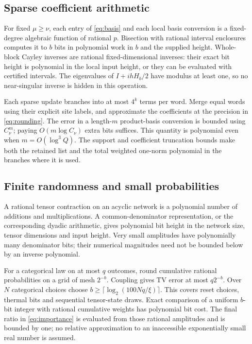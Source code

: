 \documentclass[11pt,reqno]{amsart}
\numberwithin{equation}{section}
\theoremstyle{definition}
\theoremstyle{remark}
\begin{document}
\subsection{Sparse coefficient arithmetic}
For fixed $\mu\geq\nu$, each entry of \eqref{eq:basis} and each local basis conversion is a fixed-degree algebraic function of rational $p$. Bisection with rational interval enclosures computes it to $b$ bits in polynomial work in $b$ and the supplied height. Whole-block Cayley inverses are rational fixed-dimensional inverses: their exact bit height is polynomial in the local input height, or they can be evaluated with certified intervals. The eigenvalues of $I+ihH_b/2$ have modulus at least one, so no near-singular inverse is hidden in this operation.

Each sparse update branches into at most $4^k$ terms per word. Merge equal words using their explicit site labels, and approximate the coefficients at the precision in \eqref{eq:rounding}. The error in a length-$m$ product-basis conversion is bounded using $C_\nu^m$; paying $O(m\log C_\nu)$ extra bits suffices. This quantity is polynomial even when $m=O(\log^3 Q)$. The support and coefficient truncation bounds make both the retained list and the total weighted one-norm polynomial in the branches where it is used.

\subsection{Finite randomness and small probabilities}
A rational tensor contraction on an acyclic network is a polynomial number of additions and multiplications. A common-denominator representation, or the corresponding dyadic arithmetic, gives polynomial bit height in the network size, tensor dimensions and input height. Very small amplitudes have polynomially many denominator bits; their numerical magnitudes need not be bounded below by an inverse polynomial.

For a categorical law on at most $q$ outcomes, round cumulative rational probabilities on a grid of mesh $2^{-b}$. Coupling gives TV error at most $q2^{-b}$. Over $N$ categorical choices choose $b\geq\lceil\log_2(100Nq/\xi)\rceil$. This covers reset choices, thermal bits and sequential tensor-state draws. Exact comparison of a uniform $b$-bit integer with rational cumulative weights has polynomial bit cost. The final ratio in \eqref{eq:importance} is evaluated from those rational amplitudes and is bounded by one; no relative approximation to an inaccessible exponentially small real number is assumed.
\end{document}
